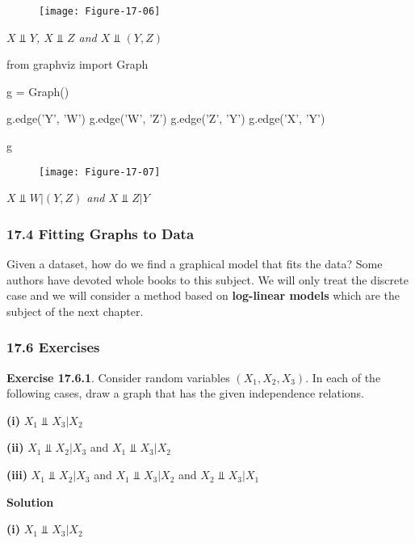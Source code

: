  
\begin{figure}[H]
\texttt{[image: Figure-17-06]}
\end{figure}

\emph{\(X \text{ ⫫ } Y\), \(X \text{ ⫫ } Z\) and
\(X \text{ ⫫ } (Y, Z)\)}

\begin{python}
from graphviz import Graph

g = Graph()

g.edge('Y', 'W')
g.edge('W', 'Z')
g.edge('Z', 'Y')
g.edge('X', 'Y')

g
\end{python}

 
\begin{figure}[H]
\texttt{[image: Figure-17-07]}
\end{figure}

\emph{\(X \text{ ⫫ } W | (Y, Z)\) and \(X \text{ ⫫ } Z | Y\)}

\subsubsection{17.4 Fitting Graphs to Data}\label{fitting-graphs-to-data}

Given a dataset, how do we find a graphical model that fits the data?
Some authors have devoted whole books to this subject. We will only
treat the discrete case and we will consider a method based on
\textbf{log-linear models} which are the subject of the next chapter.

\subsubsection{17.6 Exercises}\label{exercises}

\textbf{Exercise 17.6.1}. Consider random variables \((X_1, X_2, X_3)\).
In each of the following cases, draw a graph that has the given
independence relations.

\textbf{(i)} \(X_1 \text{ ⫫ } X_3 | X_2\)

\textbf{(ii)} \(X_1 \text{ ⫫ } X_2 | X_3\) and
\(X_1 \text{ ⫫ } X_3 | X_2\)

\textbf{(iii)} \(X_1 \text{ ⫫ } X_2 | X_3\) and
\(X_1 \text{ ⫫ } X_3 | X_2\) and \(X_2 \text{ ⫫ } X_3 | X_1\)

\textbf{Solution}

\textbf{(i)} \(X_1 \text{ ⫫ } X_3 | X_2\)

